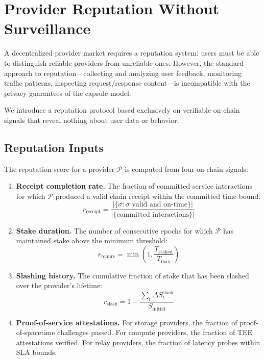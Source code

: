 \section{Provider Reputation Without Surveillance}
\label{sec:reputation}

A decentralized provider market requires a reputation system: users must be
able to distinguish reliable providers from unreliable ones. However, the
standard approach to reputation---collecting and analyzing user feedback,
monitoring traffic patterns, inspecting request/response content---is
incompatible with the privacy guarantees of the capsule model.

We introduce a reputation protocol based exclusively on verifiable on-chain
signals that reveal nothing about user data or behavior.

\subsection{Reputation Inputs}

The reputation score for a provider $\mathcal{P}$ is computed from four
on-chain signals:

\begin{enumerate}
    \item \textbf{Receipt completion rate.} The fraction of committed service
    interactions for which $\mathcal{P}$ produced a valid chain receipt within
    the committed time bound:
    \begin{equation}
        r_{\text{receipt}} = \frac{|\{\sigma : \sigma \text{ valid and on-time}\}|}{|\{\text{committed interactions}\}|}
    \end{equation}

    \item \textbf{Stake duration.} The number of consecutive epochs for which
    $\mathcal{P}$ has maintained stake above the minimum threshold:
    \begin{equation}
        r_{\text{tenure}} = \min\left(1, \frac{T_{\text{staked}}}{T_{\text{max}}}\right)
    \end{equation}

    \item \textbf{Slashing history.} The cumulative fraction of stake that has
    been slashed over the provider's lifetime:
    \begin{equation}
        r_{\text{slash}} = 1 - \frac{\sum_{t} \Delta S_t^{\text{slash}}}{S_{\text{initial}}}
    \end{equation}

    \item \textbf{Proof-of-service attestations.} For storage providers, the
    fraction of proof-of-spacetime challenges passed. For compute providers,
    the fraction of TEE attestations verified. For relay providers, the
    fraction of latency probes within SLA bounds.
\end{enumerate}

